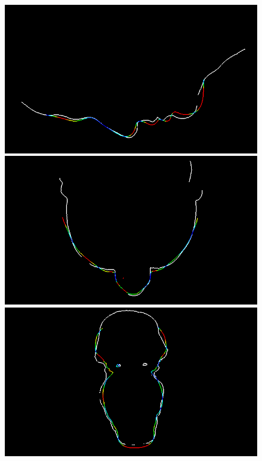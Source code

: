 \begin{figure}
  \begin{minipage}{.325\textwidth}
    \centering
    \includegraphics[width=0.99\textwidth]{Figures/eval/our/3/x-gt.png}
  \end{minipage}
  \begin{minipage}{.325\textwidth}
    \centering
    \includegraphics[width=0.99\textwidth]{Figures/eval/our/3/y-gt.png}
  \end{minipage}
  \begin{minipage}{.325\textwidth}
    \centering
    \includegraphics[width=0.99\textwidth]{Figures/eval/our/3/z-gt.png}
  \end{minipage}


\end{figure}
